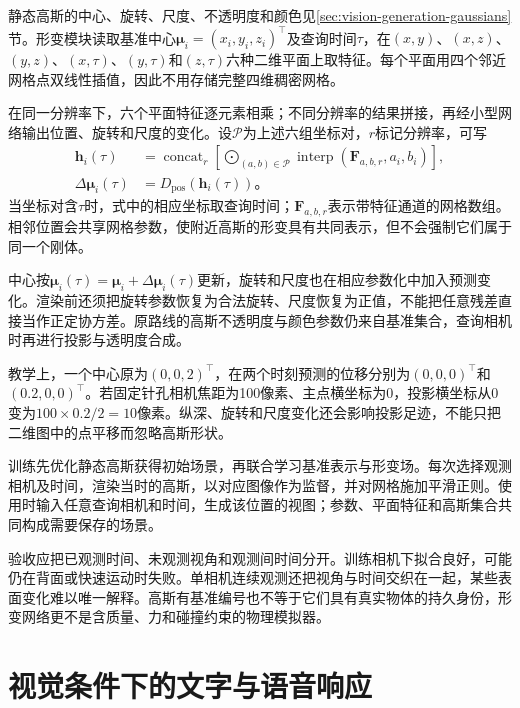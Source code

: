 静态高斯的中心、旋转、尺度、不透明度和颜色见\ref{sec:vision-generation-gaussians}节。形变模块读取基准中心$\bm\mu_i=(x_i,y_i,z_i)^\top$及查询时间$\tau$，在$(x,y)$、$(x,z)$、$(y,z)$、$(x,\tau)$、$(y,\tau)$和$(z,\tau)$六种二维平面上取特征。每个平面用四个邻近网格点双线性插值，因此不用存储完整四维稠密网格。

在同一分辨率下，六个平面特征逐元素相乘；不同分辨率的结果拼接，再经小型网络输出位置、旋转和尺度的变化。设$\mathcal P$为上述六组坐标对，$r$标记分辨率，可写
\begin{equation}
 \begin{aligned}
 \bm h_i(\tau)
 &=\mathop{\operatorname{concat}}_r
   \left[
    \mathop{\bigodot}_{(a,b)\in\mathcal P}
       \operatorname{interp}
        (\bm F_{a,b,r},a_i,b_i)
   \right],\\
 \Delta\bm\mu_i(\tau)&=D_{\mathrm{pos}}(\bm h_i(\tau))\text{。}
 \end{aligned}
 \label{eq:vision-4d-planes}
\end{equation}
当坐标对含$\tau$时，式中的相应坐标取查询时间；$\bm F_{a,b,r}$表示带特征通道的网格数组。相邻位置会共享网格参数，使附近高斯的形变具有共同表示，但不会强制它们属于同一个刚体。

中心按$\bm\mu_i(\tau)=\bm\mu_i+\Delta\bm\mu_i(\tau)$更新，旋转和尺度也在相应参数化中加入预测变化。渲染前还须把旋转参数恢复为合法旋转、尺度恢复为正值，不能把任意残差直接当作正定协方差。原路线的高斯不透明度与颜色参数仍来自基准集合，查询相机时再进行投影与透明度合成。

教学上，一个中心原为$(0,0,2)^\top$，在两个时刻预测的位移分别为$(0,0,0)^\top$和$(0.2,0,0)^\top$。若固定针孔相机焦距为100像素、主点横坐标为0，投影横坐标从0变为$100\times0.2/2=10$像素。纵深、旋转和尺度变化还会影响投影足迹，不能只把二维图中的点平移而忽略高斯形状。

训练先优化静态高斯获得初始场景，再联合学习基准表示与形变场。每次选择观测相机及时间，渲染当时的高斯，以对应图像作为监督，并对网格施加平滑正则。使用时输入任意查询相机和时间，生成该位置的视图；参数、平面特征和高斯集合共同构成需要保存的场景。

验收应把已观测时间、未观测视角和观测间时间分开。训练相机下拟合良好，可能仍在背面或快速运动时失败。单相机连续观测还把视角与时间交织在一起，某些表面变化难以唯一解释。高斯有基准编号也不等于它们具有真实物体的持久身份，形变网络更不是含质量、力和碰撞约束的物理模拟器。

\section{视觉条件下的文字与语音响应}
\label{sec:vision-multigen-response}

